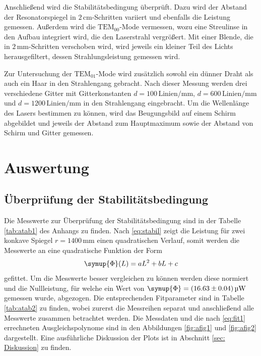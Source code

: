 Anschließend wird die Stabilitätsbedingung überprüft. Dazu wird der Abstand der Resonatorspiegel in $2 \, \si{\centi\meter}$-Schritten
variiert und ebenfalls die Leistung gemessen. 
Außerdem wird die $\text{TEM}_{00}$-Mode vermessen, wozu eine Streulinse in den Aufbau integriert wird, die den Laserstrahl vergrößert.
Mit einer Blende, die in $2 \, \si{\milli\meter}$-Schritten verschoben wird, wird jeweils ein kleiner Teil des Lichts 
herausgefiltert, dessen Strahlungsleistung gemessen wird. 

Zur Untersuchung der $\text{TEM}_{01}$-Mode wird zusätzlich sowohl ein dünner Draht als auch ein Haar in den Strahlengang gebracht.
Nach dieser Messung werden drei verschiedene Gitter mit Gitterkonstanten $d = 100 \, \text{Linien} / \si{\milli\meter}$, $d = 600 \, \text{Linien} / \si{\milli\meter}$ und $d = 1200 \, \text{Linien} / \si{\milli\meter}$
in den Strahlengang eingebracht. Um die Wellenlänge des Lasers bestimmen zu können, wird das Beugungsbild 
auf einem Schirm abgebildet und jeweils der Abstand zum Hauptmaximum sowie der Abstand von Schirm und Gitter gemessen.

\section{Auswertung}
\subsection{Überprüfung der Stabilitätsbedingung}
Die Messwerte zur Überprüfung der Stabilitätsbedingung sind in der Tabelle \ref{tab:atab1} des Anhangs zu finden.
Nach \eqref{eq:stabil} zeigt die Leistung für zwei konkave Spiegel $r=1400\,\si{\mm}$ einen quadratischen Verlauf, somit werden die Messwerte an eine quadratische Funktion der Form
\begin{equation}
    \symup{\Phi}(L) = a L^2 + b L + c \label{eq:fit1}
\end{equation}
gefittet. 
Um die Messwerte besser vergleichen zu können werden diese normiert und die Nullleistung, für welche ein Wert von $\symup{\Phi} = (16.63 \pm 0.04) \, \si{\micro\W}$ gemessen wurde, abgezogen.
Die entsprechenden Fitparameter sind in Tabelle \ref{tab:atab2} zu finden, wobei zurerst die Messreihen separat und anschließend alle Messwerte zusammen betrachtet werden. 
Die Messdaten und die nach \eqref{eq:fit1} errechneten Ausgleichspolynome sind in den Abbildungen \ref{fig:afig1} und \ref{fig:afig2} dargestellt.
Eine ausführliche Diskussion der Plots ist in Abschnitt \ref{sec: Diskussion} zu finden.

